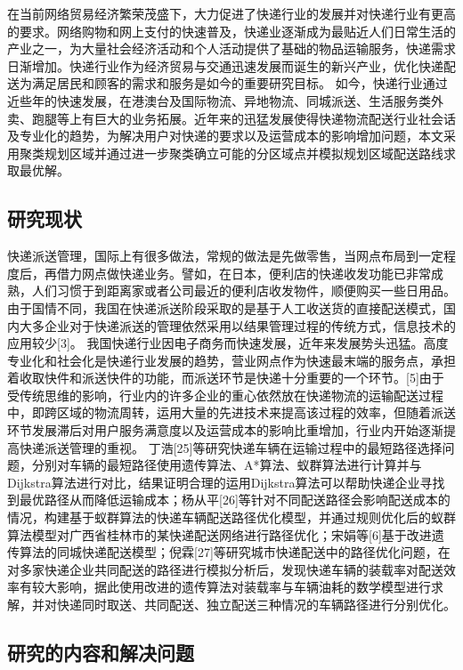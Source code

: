 在当前网络贸易经济繁荣茂盛下，大力促进了快递行业的发展并对快递行业有更高的要求。网络购物和网上支付的快速普及，快递业逐渐成为最贴近人们日常生活的产业之一，为大量社会经济活动和个人活动提供了基础的物品运输服务，快递需求日渐增加。快递行业作为经济贸易与交通迅速发展而诞生的新兴产业，优化快递配送为满足居民和顾客的需求和服务是如今的重要研究目标。
如今，快递行业通过近些年的快速发展，在港澳台及国际物流、异地物流、同城派送、生活服务类外卖、跑腿等上有巨大的业务拓展。近年来的迅猛发展使得快递物流配送行业社会话及专业化的趋势，为解决用户对快递的要求以及运营成本的影响增加问题，本文采用聚类规划区域并通过进一步聚类确立可能的分区域点并模拟规划区域配送路线求取最优解。\cite{knuth-fa}


\subsection{研究现状}

快递派送管理，国际上有很多做法，常规的做法是先做零售，当网点布局到一定程度后，再借力网点做快递业务。譬如，在日本，便利店的快递收发功能已非常成熟，人们习惯于到距离家或者公司最近的便利店收发物件，顺便购买一些日用品。由于国情不同，我国在快递派送阶段采取的是基于人工收送货的直接配送模式，国内大多企业对于快递派送的管理依然采用以结果管理过程的传统方式，信息技术的应用较少[3]。 \cite{einstein}
我国快递行业因电子商务而快速发展，近年来发展势头迅猛。高度专业化和社会化是快递行业发展的趋势，营业网点作为快速最末端的服务点，承担着收取快件和派送快件的功能，而派送环节是快递十分重要的一个环节。[5]由于受传统思维的影响，行业内的许多企业的重心依然放在快递物流的运输配送过程中，即跨区域的物流周转，运用大量的先进技术来提高该过程的效率，但随着派送环节发展滞后对用户服务满意度以及运营成本的影响比重增加，行业内开始逐渐提高快递派送管理的重视。
丁浩[25]等研究快递车辆在运输过程中的最短路径选择问题，分别对车辆的最短路径使用遗传算法、A*算法、蚁群算法进行计算并与Dijkstra算法进行对比，结果证明合理的运用Dijkstra算法可以帮助快递企业寻找到最优路径从而降低运输成本；杨从平[26]等针对不同配送路径会影响配送成本的情况，构建基于蚁群算法的快递车辆配送路径优化模型，并通过规则优化后的蚁群算法模型对广西省桂林市的某快递配送网络进行路径优化；宋娟等[6]基于改进遗传算法的同城快递配送模型；倪霖[27]等研究城市快递配送中的路径优化问题，在对多家快递企业共同配送的路径进行模拟分析后，发现快递车辆的装载率对配送效率有较大影响，据此使用改进的遗传算法对装载率与车辆油耗的数学模型进行求解，并对快递同时取送、共同配送、独立配送三种情况的车辆路径进行分别优化。

\subsection{研究的内容和解决问题}

